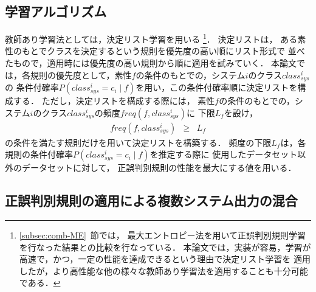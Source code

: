 \subsection{学習アルゴリズム}
\label{subsec:DL}

教師あり学習法としては，決定リスト学習を用いる
\footnote{
  \ref{subsec:comb-ME}~節では，
  最大エントロピー法を用いて正誤判別規則学習を行なった結果との比較を行なっている．
  本論文では，実装が容易，学習が高速で，かつ，一定の性能を達成できるという理由で決定リスト学習を
  適用したが，より高性能な他の様々な教師あり学習法を適用することも十分可能である．
}．
決定リスト\cite{Rivest87a,Yarowsky94a}は，
ある素性のもとでクラスを決定するという規則を優先度の高い順にリスト形式で
並べたもので，適用時には優先度の高い規則から順に適用を試みていく．
本論文では，各規則の優先度として，素性$f$の条件のもとでの，システム$i$のクラス$class_{sys}^i$の
条件付確率$P(class_{sys}^i\!=\!c_i\mid f)$を用い，この条件付確率順に決定リストを構成する．
ただし，決定リストを構成する際には，
素性$f$の条件のもとでの，システム$i$のクラス$class_{sys}^i$の頻度$freq(f,class_{sys}^i)$に
下限$L_f$を設け，
\begin{eqnarray}\label{eqn:lbdF}
 freq(f,class_{sys}^i) & \geq & L_f
\end{eqnarray}
の条件を満たす規則だけを用いて決定リストを構築する．
頻度の下限$L_f$は，各規則の条件付確率$P(class_{sys}^i\!=\!c_i\mid f)$を推定する際に
使用したデータセット以外のデータセットに対して，
正誤判別規則の性能を最大にする値を用いる．

\subsection{正誤判別規則の適用による複数システム出力の混合}
\label{subsec:apl}

